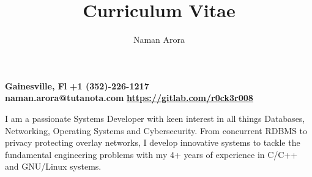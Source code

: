\documentclass[10pt,a4paper]{article}
\makeatletter
\renewcommand{\maketitle}
{
    \begin{flushleft}
    \textbf{\Huge\theauthor}
    \end{flushleft}
    \begin{flushleft}
    \small{\textbf{\faMapMarker \hspace{0.2cm} Gainesville, Fl} \hspace{2.5cm} \textbf{\faMobile \hspace{0.2cm} +1 (352)-226-1217} \\ \textbf{\faEnvelope \hspace{0.1cm} naman.arora@tutanota.com} \hspace{0.5cm} \textbf{\faGitlab \hspace{0.1cm} \href{https://gitlab.com/r0ck3r008}{https://gitlab.com/r0ck3r008}}}
    \end{flushleft}
}
\makeatother
\begin{document}
\title{Curriculum Vitae}
\author{Naman Arora}
\maketitle

\begin{tcolorbox}[enhanced,attach boxed title to top left={yshift=-3mm,yshifttext=-1mm},
		colback=aliceblue,colframe=blue,colbacktitle=blue,
		title=Summary ,fonttitle=\large\bfseries,
	boxed title style={size=small,colframe=blue} ]

\begin{flushleft}
    I am a passionate Systems Developer with keen interest in all things Databases, Networking, Operating Systems and Cybersecurity. From concurrent RDBMS to privacy protecting overlay networks, I develop innovative systems to tackle the fundamental engineering problems with my 4+ years of experience in C/C++ and GNU/Linux systems.
\end{flushleft}


\end{tcolorbox}

\end{document}
